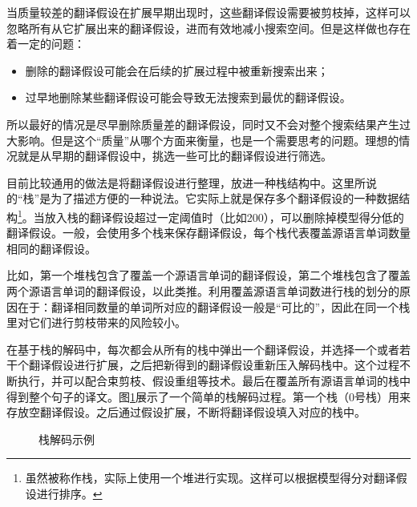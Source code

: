 \parinterval 当质量较差的翻译假设在扩展早期出现时，这些翻译假设需要被剪枝掉，这样可以忽略所有从它扩展出来的翻译假设，进而有效地减小搜索空间。但是这样做也存在着一定的问题：

\begin{itemize}
\vspace{0.5em}
\item 删除的翻译假设可能会在后续的扩展过程中被重新搜索出来；
\vspace{0.5em}
\item 过早地删除某些翻译假设可能会导致无法搜索到最优的翻译假设。
\vspace{0.5em}
\end{itemize}

所以最好的情况是尽早删除质量差的翻译假设，同时又不会对整个搜索结果产生过大影响。但是这个“质量”从哪个方面来衡量，也是一个需要思考的问题。理想的情况就是从早期的翻译假设中，挑选一些可比的翻译假设进行筛选。

\parinterval 目前比较通用的做法是将翻译假设进行整理，放进一种栈结构中。这里所说的“栈”是为了描述方便的一种说法。它实际上就是保存多个翻译假设的一种数据结构\footnote[4]{虽然被称作栈，实际上使用一个堆进行实现。这样可以根据模型得分对翻译假设进行排序。}。当放入栈的翻译假设超过一定阈值时（比如200），可以删除掉模型得分低的翻译假设。一般，会使用多个栈来保存翻译假设，每个栈代表覆盖源语言单词数量相同的翻译假设。

\parinterval 比如，第一个堆栈包含了覆盖一个源语言单词的翻译假设，第二个堆栈包含了覆盖两个源语言单词的翻译假设，以此类推。利用覆盖源语言单词数进行栈的划分的原因在于：翻译相同数量的单词所对应的翻译假设一般是“可比的”，因此在同一个栈里对它们进行剪枝带来的风险较小。

\parinterval 在基于栈的解码中，每次都会从所有的栈中弹出一个翻译假设，并选择一个或者若干个翻译假设进行扩展，之后把新得到的翻译假设重新压入解码栈中。这个过程不断执行，并可以配合束剪枝、假设重组等技术。最后在覆盖所有源语言单词的栈中得到整个句子的译文。图\ref{fig:7-30}展示了一个简单的栈解码过程。第一个栈（0号栈）用来存放空翻译假设。之后通过假设扩展，不断将翻译假设填入对应的栈中。

\begin{figure}[htp]
\centering

\caption{栈解码示例}
\label{fig:7-30}
\end{figure}


